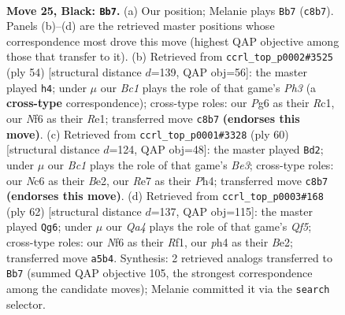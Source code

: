 \documentclass[11pt]{article}
\begin{document}
\clearpage

\begin{figure}[p]\centering
\begin{subfigure}{0.46\textwidth}\centering
\resizebox{\linewidth}{!}{%
\newchessgame
\chessboard[
  setfen={r1b3k1/P3rp2/1pn2np1/qN1p2Np/P2P1P1P/R2B2P1/2Q2K2/7R b - - 2 25},
  showmover=false,
  pgfstyle=straightmove, color=movearrow, markmove={c8-b7}
]}
\caption{}
\end{subfigure}\hfill
\begin{subfigure}{0.46\textwidth}\centering
\resizebox{\linewidth}{!}{%
\newchessgame
\chessboard[
  setfen={3qbrk1/2r3np/3npppQ/1p1p4/3P2N1/1PPB1N1P/5PP1/2R1R1K1 w - - 3 28},
  showmover=false,
  pgfstyle=straightmove, color=movearrow, markmove={h3-h4}
]}
\caption{}
\end{subfigure}
\\[4pt]
\begin{subfigure}{0.46\textwidth}\centering
\resizebox{\linewidth}{!}{%
\newchessgame
\chessboard[
  setfen={4r1k1/1q1b1pb1/p2p2p1/n2P2Np/1Np1PP1P/R3B3/1nQ1B1PK/8 w - - 2 31},
  showmover=false,
  pgfstyle=straightmove, color=movearrow, markmove={e3-d2}
]}
\caption{}
\end{subfigure}\hfill
\begin{subfigure}{0.46\textwidth}\centering
\resizebox{\linewidth}{!}{%
\newchessgame
\chessboard[
  setfen={2r1nk1r/p3p3/qp1p1p1p/1N1P1Qn1/1PPB4/P7/4B1P1/1K3R2 w - - 0 32},
  showmover=false,
  pgfstyle=straightmove, color=movearrow, markmove={f5-g6}
]}
\caption{}
\end{subfigure}
\caption{\textbf{Move 25, Black: \texttt{Bb7}.} (a) Our position; Melanie plays \texttt{Bb7} (\texttt{c8b7}). Panels (b)--(d) are the retrieved master positions whose correspondence most drove this move (highest QAP objective among those that transfer to it). (b) Retrieved from \texttt{ccrl\_top\_p0002\#3525} (ply 54) [structural distance $d$=139, QAP obj=56]: the master played \texttt{h4}; under $\mu$ our \emph{Bc1} plays the role of that game's \emph{Ph3} (a \textbf{cross-type} correspondence); cross-type roles: our \emph{P}g6 as their \emph{R}c1, our \emph{N}f6 as their \emph{R}e1; transferred move \texttt{c8b7} \textbf{(endorses this move)}. (c) Retrieved from \texttt{ccrl\_top\_p0001\#3328} (ply 60) [structural distance $d$=124, QAP obj=48]: the master played \texttt{Bd2}; under $\mu$ our \emph{Bc1} plays the role of that game's \emph{Be3}; cross-type roles: our \emph{N}c6 as their \emph{B}e2, our \emph{R}e7 as their \emph{P}h4; transferred move \texttt{c8b7} \textbf{(endorses this move)}. (d) Retrieved from \texttt{ccrl\_top\_p0003\#168} (ply 62) [structural distance $d$=137, QAP obj=115]: the master played \texttt{Qg6}; under $\mu$ our \emph{Qa4} plays the role of that game's \emph{Qf5}; cross-type roles: our \emph{N}f6 as their \emph{R}f1, our \emph{p}h4 as their \emph{B}e2; transferred move \texttt{a5b4}. Synthesis: 2 retrieved analogs transferred to \texttt{Bb7} (summed QAP objective 105, the strongest correspondence among the candidate moves); Melanie committed it via the \texttt{search} selector.}
\label{fig:thought-m49}
\end{figure}
\end{document}
